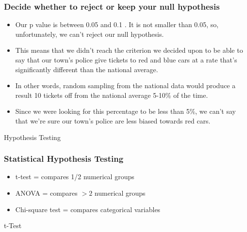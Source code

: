 \begin{frame}
\frametitle{Decide whether to reject or keep your null hypothesis}
\begin{itemize}
\item Our p value is between 0.05 and 0.1 . It is not smaller than 0.05, so, unfortunately, we can't reject our null hypothesis. 
\item This means that we didn't reach the criterion we decided upon to be able to say that our town's police give tickets to red and blue cars at a rate that's significantly different than the national average.
\item In other words, random sampling from the national data would produce a result 10 tickets off from the national average 5-10\% of the time.

\item Since we were looking for this percentage to be less than 5\%, we can't say that we're sure our town's police are less biased towards red cars.
\end{itemize}

\end{frame}

\begin{frame}
\begin{center}
{\Large Hypothesis Testing}
\end{center}
\end{frame}

\begin{frame}[fragile]\frametitle{Statistical Hypothesis Testing}
\begin{itemize}
\item t-test = compares 1/2 numerical groups
\item ANOVA = compares $> 2$ numerical groups
\item Chi-square test  = compares categorical variables
\end{itemize}
\end{frame}

\begin{frame}
\begin{center}
{\Large t-Test}
\end{center}
\end{frame}

